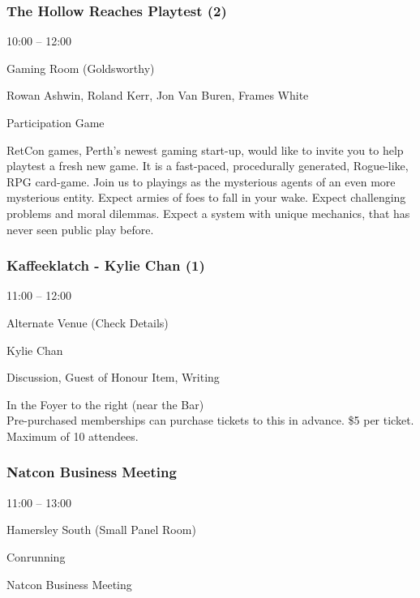 \documentclass{scrreprt}
\begin{document}
\begin{multicols}{2}
\subsubsection*{The Hollow Reaches Playtest (2)}\begin{description}
\setlength{\itemsep}{0pt}
\setlength{\parsep}{0pt}
\setlength{\parskip}{0pt}
\item[Time:]{10:00 -- 12:00}
\item[Venue:]{Gaming Room (Goldsworthy)}
\item[People:]{Rowan Ashwin, Roland Kerr, Jon Van Buren, Frames White}
\item[Tags:]{Participation Game}\end{description}
RetCon games, Perth's newest gaming start-up, would like to invite you to help playtest a fresh new game. It is a fast-paced, procedurally generated, Rogue-like, RPG card-game. Join us to playings as the mysterious agents of an even more mysterious entity. Expect armies of foes to fall in your wake. Expect challenging problems and moral dilemmas. Expect a system with unique mechanics, that has never seen public play before.
\subsubsection*{Kaffeeklatch - Kylie Chan (1)}\begin{description}
\setlength{\itemsep}{0pt}
\setlength{\parsep}{0pt}
\setlength{\parskip}{0pt}
\item[Time:]{11:00 -- 12:00}
\item[Venue:]{Alternate Venue (Check Details)}
\item[People:]{Kylie Chan}
\item[Tags:]{Discussion, Guest of Honour Item, Writing}\end{description}
In the Foyer to the right (near the Bar) \\Pre-purchased memberships can purchase tickets to this in advance. \$5 per ticket. Maximum of 10 attendees.
\subsubsection*{Natcon Business Meeting}\begin{description}
\setlength{\itemsep}{0pt}
\setlength{\parsep}{0pt}
\setlength{\parskip}{0pt}
\item[Time:]{11:00 -- 13:00}
\item[Venue:]{Hamersley South (Small Panel Room)}
\item[Tags:]{Conrunning}\end{description}
Natcon Business Meeting

\end{multicols}
\end{document}

